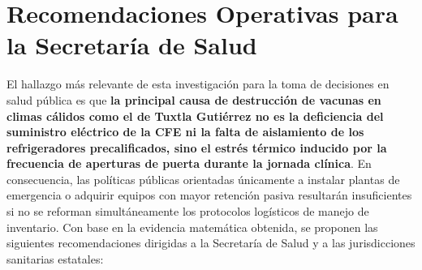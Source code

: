 \documentclass[
  spanish,
  letterpaper,
  DIV=11,
  numbers=noendperiod]{scrreprt}
\theoremstyle{plain}
\theoremstyle{plain}
\theoremstyle{plain}
\theoremstyle{definition}
\theoremstyle{remark}
\begin{document}
\section{Recomendaciones Operativas para la Secretaría de
Salud}\label{recomendaciones-operativas-para-la-secretaruxeda-de-salud}

El hallazgo más relevante de esta investigación para la toma de
decisiones en salud pública es que \textbf{la principal causa de
destrucción de vacunas en climas cálidos como el de Tuxtla Gutiérrez no
es la deficiencia del suministro eléctrico de la CFE ni la falta de
aislamiento de los refrigeradores precalificados, sino el estrés térmico
inducido por la frecuencia de aperturas de puerta durante la jornada
clínica}. En consecuencia, las políticas públicas orientadas únicamente
a instalar plantas de emergencia o adquirir equipos con mayor retención
pasiva resultarán insuficientes si no se reforman simultáneamente los
protocolos logísticos de manejo de inventario. Con base en la evidencia
matemática obtenida, se proponen las siguientes recomendaciones
dirigidas a la Secretaría de Salud y a las jurisdicciones sanitarias
estatales:
\end{document}
